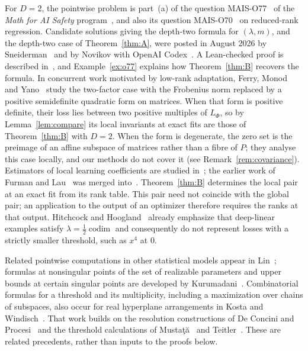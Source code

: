 \documentclass[11pt,a4paper]{article}
\theoremstyle{definition}
\theoremstyle{remark}
\numberwithin{equation}{section}
\newcommand{\codim}{\operatorname{codim}}
\begin{document}
For $D=2$, the pointwise problem is part~(a) of the question MAIS-O77~\cite{mais-o77} of the \emph{Math for AI Safety} program~\cite{levine-mais,mais-repo}, and also its question MAIS-O70~\cite{mais-o70} on reduced-rank regression. Candidate solutions giving the depth-two formula for $(\lambda,m)$, and the depth-two case of Theorem~\ref{thm:A}, were posted in August 2026 by Sneiderman~\cite{mais-issue-3} and by Novikov with OpenAI Codex~\cite{mais-issue-12}. A Lean-checked proof is described in~\cite{feld-o77}, and Example~\ref{ex:o77} explains how Theorem~\ref{thm:B} recovers the formula. In concurrent work motivated by low-rank adaptation, Ferry, Monod and Yano~\cite{ferry-monod-yano} study the two-factor case with the Frobenius norm replaced by a positive semidefinite quadratic form on matrices. When that form is positive definite, their loss lies between two positive multiples of $L_\Phi$, so by Lemma~\ref{lem:compare} its local invariants at exact fits are those of Theorem~\ref{thm:B} with $D=2$. When the form is degenerate, the zero set is the preimage of an affine subspace of matrices rather than a fibre of $P$; they analyse this case locally, and our methods do not cover it (see Remark~\ref{rem:covariance}). Estimators of local learning coefficients are studied in~\cite{lau-llc,hitchcock-hoogland}; the earlier work of Furman and Lau~\cite{furman-lau} was merged into~\cite{lau-llc}. Theorem~\ref{thm:B} determines the local pair at an exact fit from its rank table. This pair need not coincide with the global pair; an application to the output of an optimizer therefore requires the ranks at that output. Hitchcock and Hoogland~\cite[Remark~B.6]{hitchcock-hoogland} already emphasize that deep-linear examples satisfy $\lambda=\tfrac12\codim$ and consequently do not represent losses with a strictly smaller threshold, such as $x^4$ at $0$.

Related pointwise computations in other statistical models appear in Lin~\cite[Section~5]{lin}; formulas at nonsingular points of the set of realizable parameters and upper bounds at certain singular points are developed by Kurumadani~\cite{kurumadani,kurumadani-upper}. Combinatorial formulas for a threshold and its multiplicity, including a maximization over chains of subspaces, also occur for real hyperplane arrangements in Kosta and Windisch~\cite[Theorem~4.2 and Corollary~4.4]{kosta-windisch}. That work builds on the resolution constructions of De Concini and Procesi~\cite{deconcini-procesi} and the threshold calculations of Mustaţă~\cite{mustata-arrangements} and Teitler~\cite{teitler}. These are related precedents, rather than inputs to the proofs below.
\end{document}
